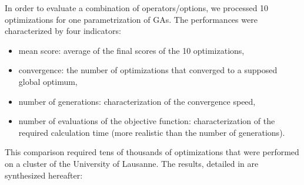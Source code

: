 \documentclass[twocol]{ametsoc}
\begin{document}
In order to evaluate a combination of operators/options, we processed 10 optimizations for one parametrization of GAs. The performances were characterized by four indicators:

\begin{itemize}
	\item mean score: average of the final scores of the 10 optimizations,
	\item convergence: the number of optimizations that converged to a supposed global optimum,
	\item number of generations: characterization of the convergence speed,
	\item number of evaluations of the objective function: characterization of the required calculation time (more realistic than the number of generations).
\end{itemize}

This comparison required tens of thousands of optimizations that were performed on a cluster of the University of Lausanne. The results, detailed in \citet{Horton2012a} are synthesized hereafter:
\end{document}
